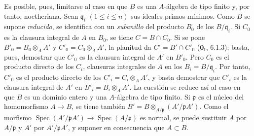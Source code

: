 Es posible, pues, limitarse al caso en que $B$ es una $A$-álgebra de
tipo finito y, por tanto, noetheriana. Sean $\mathfrak q_i$
$(1\leqslant i\leqslant n)$ sus ideales primos mínimos. Como $B$ se
supone \emph{reducido}, se identifica con un \emph{subanillo} del producto $B_0$
de los $B/\mathfrak q_i$. Si $C_0$ es la clausura integral de $A$
en $B_0$, se tiene $C=B\cap C_0$. Si se pone
$B'_0=B_0\otimes_A A'$ y $C'_0=C_0\otimes_A A'$, la planitud da
$C'=B'\cap C'_0$ ($\mathbf{0}_{\mathrm I}$, 6.1.3); basta, pues, demostrar
que $C'_0$ es la clausura integral de $A'$ en $B'_0$. Pero $C_0$ es
el producto directo de los $C_i$, clausuras integrales de $A$ en los
$B_i=B/\mathfrak q_i$. Por tanto, $C'_0$ es el producto directo de
los $C'_i=C_i\otimes_A A'$, y basta demostrar que $C'_i$ es la
clausura integral de $A'$ en $B'_i=B_i\otimes_A A'$. La cuestión se reduce así al caso en que $B$ es un dominio entero y una $A$-álgebra
de tipo finito. Si $\mathfrak p$ es el núcleo del homomorfismo
$A\to B$, se tiene también
$B'=B\otimes_{A/\mathfrak p}(A'/\mathfrak pA')$. Como el morfismo
$\operatorname{Spec}(A'/\mathfrak pA')\to
\operatorname{Spec}(A/\mathfrak p)$ es normal, se puede sustituir
$A$ por $A/\mathfrak p$ y $A'$ por $A'/\mathfrak pA'$, y suponer
en consecuencia que $A\subset B$.

